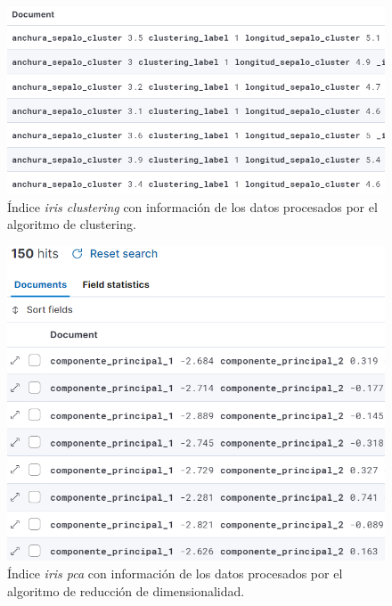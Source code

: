 \begin{figure}
    \centering
    \includegraphics[width=1\linewidth]{img/iris16.png}
    \caption{Índice \textit{iris clustering} con información de los datos procesados por el algoritmo de clustering.}
    \label{fig:index4}
\end{figure}



\begin{figure}
    \centering
    \includegraphics[width=1\linewidth]{img/iris17.png}
    \caption{Índice \textit{iris pca} con información de los datos procesados por el algoritmo de reducción de dimensionalidad.}
    \label{fig:index5}
\end{figure}









